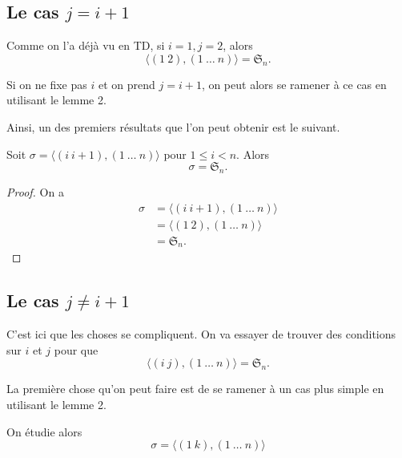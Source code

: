 \documentclass[french,a4paper,10pt]{article}
\begin{document}
    \subsection*{Le cas \(j = i+1\)}

    Comme on l'a déjà vu en TD, si \(i = 1, j = 2\), alors
    \begin{equation*}
        \langle (1~2), (1~\ldots~n) \rangle = \mathfrak S_n.
    \end{equation*}

    Si on ne fixe pas \(i\) et on prend \(j = i+1\), on peut alors se ramener à ce cas en utilisant le lemme 2.

    Ainsi, un des premiers résultats que l'on peut obtenir est le suivant.

    \begin{theorem}
        Soit \( \sigma = \langle (i~i+1), (1~\ldots~n) \rangle \) pour \( 1 \leq i < n \). Alors
        \begin{equation*}
            \sigma = \mathfrak S_n.
        \end{equation*}
    \end{theorem}

    \begin{proof}
        On a
        \begin{align*}
            \sigma &= \langle (i~i+1), (1~\ldots~n) \rangle \\
            &= \langle (1~2), (1~\ldots~n) \rangle \\
            &= \mathfrak S_n.
        \end{align*}
    \end{proof}

    \subsection*{Le cas \(j \neq i+1\)}

    C'est ici que les choses se compliquent. On va essayer de trouver des conditions sur \(i\) et \(j\) pour que
    \begin{equation*}
        \langle (i~j), (1~\ldots~n) \rangle = \mathfrak S_n.
    \end{equation*}

    La première chose qu'on peut faire est de se ramener à un cas plus simple en utilisant le lemme 2.

    On étudie alors
    \begin{equation*}
        \sigma = \langle (1~k), (1~\ldots~n) \rangle
    \end{equation*}
\end{document}
